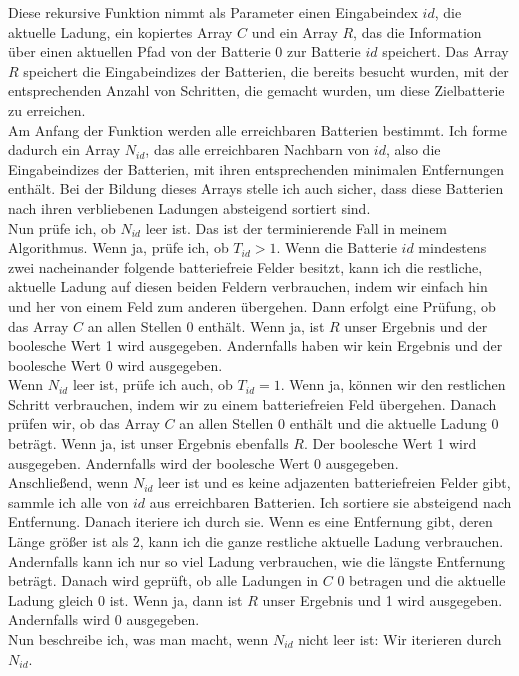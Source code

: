 \documentclass[a4paper,10pt,ngerman]{scrartcl}
\begin{document}
Diese rekursive Funktion nimmt als Parameter einen Eingabeindex $id$, die aktuelle Ladung, ein kopiertes Array $C$
und ein Array $R$, das die Information über einen aktuellen Pfad von der Batterie 0 zur Batterie $id$ speichert.
Das Array $R$ speichert die Eingabeindizes der Batterien, die bereits besucht wurden, mit der entsprechenden Anzahl von Schritten,
die gemacht wurden, um diese Zielbatterie zu erreichen.\\
Am Anfang der Funktion werden alle erreichbaren Batterien bestimmt. Ich forme dadurch ein Array $N_{id}$, das alle
erreichbaren Nachbarn von $id$, also die Eingabeindizes der Batterien, mit ihren entsprechenden minimalen Entfernungen enthält.
Bei der Bildung dieses Arrays stelle ich auch sicher, dass diese Batterien nach ihren verbliebenen Ladungen absteigend
sortiert sind.\\
Nun prüfe ich, ob $N_{id}$ leer ist. Das ist der terminierende Fall in meinem Algorithmus.
Wenn ja, prüfe ich, ob $T_{id} > 1$. Wenn die Batterie $id$ mindestens zwei nacheinander folgende batteriefreie Felder besitzt,
kann ich die restliche, aktuelle Ladung auf diesen beiden Feldern verbrauchen, indem wir einfach hin und her von einem 
Feld zum anderen übergehen. 
Dann erfolgt eine Prüfung, ob das Array $C$ an allen Stellen 0 enthält. Wenn ja, ist $R$ unser Ergebnis und der boolesche Wert 1 wird
ausgegeben. Andernfalls haben wir kein Ergebnis und der boolesche Wert 0 wird ausgegeben.\\
Wenn $N_{id}$ leer ist, prüfe ich auch, ob $T_{id} = 1$. Wenn ja, können wir den restlichen Schritt verbrauchen, 
indem wir zu einem batteriefreien Feld übergehen. Danach prüfen wir, ob das Array $C$ an allen Stellen 0 enthält und die
aktuelle Ladung 0 beträgt. Wenn ja, ist unser Ergebnis ebenfalls $R$. Der boolesche Wert 1 wird ausgegeben. Andernfalls wird
der boolesche Wert 0 ausgegeben.\\
Anschließend, wenn $N_{id}$ leer ist und es keine adjazenten batteriefreien Felder gibt,
sammle ich alle von $id$ aus erreichbaren Batterien.
Ich sortiere sie absteigend nach Entfernung. Danach iteriere ich durch sie. Wenn es eine Entfernung gibt,
deren Länge größer ist als 2, kann ich 
die ganze restliche aktuelle Ladung verbrauchen. Andernfalls kann ich nur so viel Ladung verbrauchen,
wie die längste Entfernung beträgt.
Danach wird geprüft, ob alle Ladungen in $C$ 0 betragen und die aktuelle Ladung gleich 0 ist.
Wenn ja, dann ist $R$ unser Ergebnis und 1 wird ausgegeben. Andernfalls wird 0 ausgegeben.\\
Nun beschreibe ich, was man macht, wenn $N_{id}$ nicht leer ist: Wir iterieren durch $N_{id}$.
\end{document}
